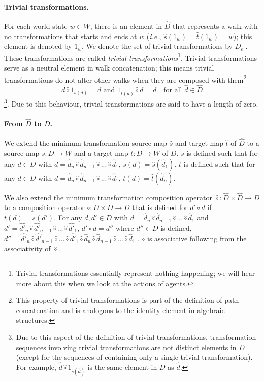 \paragraph{Trivial transformations.}
For each world state $w \in W$, there is an element in $\hat{D}$ that represents a walk with no transformations that starts and ends at $w$ (\textit{i.e.}, $\hat{s}(1_{w}) = \hat{t}(1_{w}) = w$); this element is denoted by $1_{w}$.
We denote the set of trivial transformations by $D_{\epsilon}$ .
These transformations are called \emph{trivial transformations}\footnote{Trivial transformations essentially represent nothing happening; we will hear more about this when we look at the actions of agents.}.
Trivial transformations serve as a neutral element in walk concatenation; this means trivial transformations do not alter other walks when they are composed with them\footnote{This property of trivial transformations is part of the definition of path concatenation and is analogous to the identity element in algebraic structures.}
\begin{equation}
    d \hat{\circ} 1_{\hat{s}(d)} = d \text{ and } 1_{\hat{t}(d)} \hat{\circ} d = d \quad \text{for all $\hat{d} \in \hat{D}$}
\end{equation}
 \footnote{Due to this aspect of the definition of trivial transformations, transformation sequences involving trivial transformations are not distinct elements in $D$ (except for the sequences of containing only a single trivial transformation).
	For example, $\hat{d} \hat{\circ} 1_{\hat{s}(\hat{d})}$ is the same element in $D$ as $\hat{d}$.}.
Due to this behaviour, trivial transformations are said to have a length of zero.

\paragraph{From $\hat{D}$ to $D$.}
We extend the minimum transformation source map $\hat{s}$ and target map $\hat{t}$ of $\hat{D}$ to a source map $s: D \to W$ and a target map $t: D \to W$ of $D$.
$s$ is defined such that for any $d \in D$ with $d = \hat{d}_{n} \hat{\circ} \hat{d}_{n-1} \hat{\circ} ... \hat{\circ} \hat{d}_{1}$, $s(d) = \hat{s}(\hat{d}_{1})$.
$t$ is defined such that for any $d \in D$ with $d = \hat{d}_{n} \hat{\circ} \hat{d}_{n-1} \hat{\circ} ... \hat{\circ} \hat{d}_{1}$, $t(d) = \hat{t}(\hat{d}_{n})$.

We also extend the minimum transformation composition operator $\hat{\circ}: \hat{D} \times \hat{D} \to D$ to a composition operator $\circ: D \times D \to D$ that is defined for $d' \circ d$ if $t(d) = s(d')$.
For any $d, d' \in D$ with $d = \hat{d}_{n} \hat{\circ} \hat{d}_{n-1} \hat{\circ} ... \hat{\circ} \hat{d}_{1}$ and $d' = \hat{d'}_{n} \hat{\circ} \hat{d'}_{n-1} \hat{\circ} ... \hat{\circ} \hat{d'}_{1}$, $d' \circ d = d''$ where $d'' \in D$ is defined, $d'' = \hat{d'}_{n} \hat{\circ} \hat{d'}_{n-1} \hat{\circ} ... \hat{\circ} \hat{d'}_{1} \hat{\circ} \hat{d}_{n} \hat{\circ} \hat{d}_{n-1} \hat{\circ} ... \hat{\circ} \hat{d}_{1}$ .
$\circ$ is associative following from the associativity of $\hat{\circ}$.


